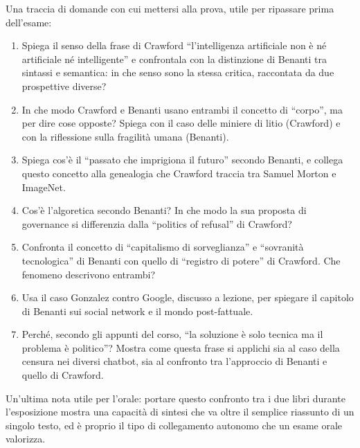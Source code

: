 \documentclass[a4paper,11pt]{article}
\begin{document}
Una traccia di domande con cui mettersi alla prova, utile per ripassare prima dell'esame:

\begin{enumerate}
  \item Spiega il senso della frase di Crawford ``l'intelligenza artificiale non è né artificiale né intelligente'' e confrontala con la distinzione di Benanti tra sintassi e semantica: in che senso sono la stessa critica, raccontata da due prospettive diverse?
  \item In che modo Crawford e Benanti usano entrambi il concetto di ``corpo'', ma per dire cose opposte? Spiega con il caso delle miniere di litio (Crawford) e con la riflessione sulla fragilità umana (Benanti).
  \item Spiega cos'è il ``passato che imprigiona il futuro'' secondo Benanti, e collega questo concetto alla genealogia che Crawford traccia tra Samuel Morton e ImageNet.
  \item Cos'è l'algoretica secondo Benanti? In che modo la sua proposta di governance si differenzia dalla ``politics of refusal'' di Crawford?
  \item Confronta il concetto di ``capitalismo di sorveglianza'' e ``sovranità tecnologica'' di Benanti con quello di ``registro di potere'' di Crawford. Che fenomeno descrivono entrambi?
  \item Usa il caso Gonzalez contro Google, discusso a lezione, per spiegare il capitolo di Benanti sui social network e il mondo post-fattuale.
  \item Perché, secondo gli appunti del corso, ``la soluzione è solo tecnica ma il problema è politico''? Mostra come questa frase si applichi sia al caso della censura nei diversi chatbot, sia al confronto tra l'approccio di Benanti e quello di Crawford.
\end{enumerate}

Un'ultima nota utile per l'orale: portare questo confronto tra i due libri durante l'esposizione mostra una capacità di sintesi che va oltre il semplice riassunto di un singolo testo, ed è proprio il tipo di collegamento autonomo che un esame orale valorizza.
\end{document}
